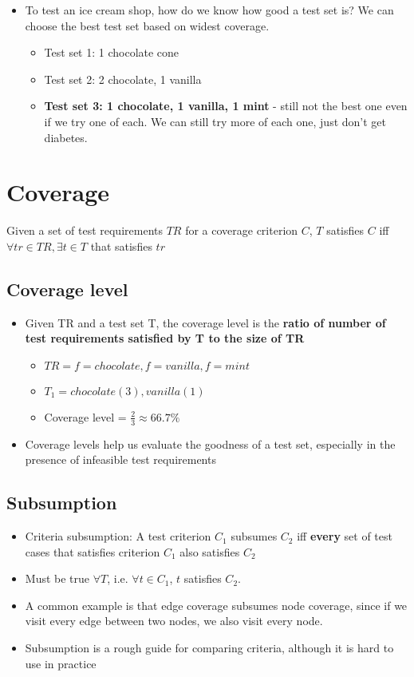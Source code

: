 \documentclass[12pt]{book}
\begin{document}
\begin{itemize}
  \item To test an ice cream shop, how do we know how good a test set is? We can choose the best test set based on widest coverage.
  \begin{itemize}
    \item Test set 1: 1 chocolate cone
    \item Test set 2: 2 chocolate, 1 vanilla
    \item \textbf{Test set 3: 1 chocolate, 1 vanilla, 1 mint} - still not the best one even if we try one of each. We can still try more of each one, just don't get diabetes.
  \end{itemize}
\end{itemize}

\section{Coverage}

Given a set of test requirements $TR$ for a coverage criterion $C$, $T$ satisfies $C$ iff $\forall tr\in TR, \exists t\in T$ that satisfies $tr$ 

\subsection{Coverage level}
\begin{itemize}
  \item Given TR and a test set T, the coverage level is the \textbf{ratio of number of test requirements satisfied by T to the size of TR}
  \begin{itemize}
    \item $TR={f=chocolate, f=vanilla, f=mint}$
    \item $T_1={chocolate(3), vanilla(1)}$
    \item Coverage level = $\frac{2}{3}\approx 66.7\%$
  \end{itemize} 

  \item Coverage levels help us evaluate the goodness of a test set, especially in the presence of infeasible test requirements
\end{itemize}

\subsection{Subsumption}
\begin{itemize}
  \item Criteria subsumption: A test criterion $C_1$ subsumes $C_2$ iff \textbf{every} set of test cases that satisfies criterion $C_1$ also satisfies $C_2$
  \item Must be true $\forall T$, i.e. $\forall t\in C_1$, $t$ satisfies $C_2$.
  \item A common example is that edge coverage subsumes node coverage, since if we visit every edge between two nodes, we also visit every node.
  \item Subsumption is a rough guide for comparing criteria, although it is hard to use in practice
\end{itemize}
\end{document}
